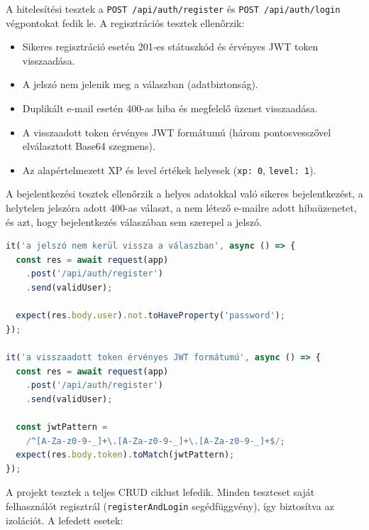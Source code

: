 
A hitelesítési tesztek a \texttt{POST /api/auth/register} és \texttt{POST /api/auth/login} végpontokat fedik le. A regisztrációs tesztek ellenőrzik:

\begin{itemize}
  \item Sikeres regisztráció esetén 201-es státuszkód és érvényes JWT token visszaadása.
  \item A jelszó nem jelenik meg a válaszban (adatbiztonság).
  \item Duplikált e-mail esetén 400-as hiba és megfelelő üzenet visszaadása.
  \item A visszaadott token érvényes JWT formátumú (három pontosvesszővel elválasztott Base64 szegmens).
  \item Az alapértelmezett XP és level értékek helyesek (\texttt{xp: 0}, \texttt{level: 1}).
\end{itemize}

A bejelentkezési tesztek ellenőrzik a helyes adatokkal való sikeres bejelentkezést, a helytelen jelszóra adott 400-as választ, a nem létező e-mailre adott hibaüzenetet, és azt, hogy bejelentkezés válaszában sem szerepel a jelszó.

\begin{lstlisting}[language=JavaScript, caption={Regisztrációs teszt részlet (auth.test.ts)}]
it('a jelszó nem kerül vissza a válaszban', async () => {
  const res = await request(app)
    .post('/api/auth/register')
    .send(validUser);

  expect(res.body.user).not.toHaveProperty('password');
});

it('a visszaadott token érvényes JWT formátumú', async () => {
  const res = await request(app)
    .post('/api/auth/register')
    .send(validUser);

  const jwtPattern =
    /^[A-Za-z0-9-_]+\.[A-Za-z0-9-_]+\.[A-Za-z0-9-_]+$/;
  expect(res.body.token).toMatch(jwtPattern);
});
\end{lstlisting}


A projekt tesztek a teljes CRUD ciklust lefedik. Minden teszteset saját felhasználót regisztrál (\texttt{registerAndLogin} segédfüggvény), így biztosítva az izolációt. A lefedett esetek:

